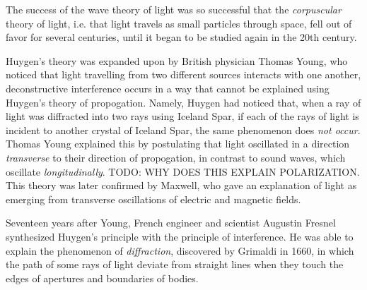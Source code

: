 The success of the wave theory of light was so successful that the \emph{corpuscular} theory of light, i.e. that light travels as small particles through space, fell out of favor for several centuries, until it began to be studied again in the 20th century.

Huygen's theory was expanded upon by British physician Thomas Young, who noticed that light travelling from two different sources interacts with one another, deconstructive interference occurs in a way that cannot be explained using Huygen's theory of propogation. Namely, Huygen had noticed that, when a ray of light was diffracted into two rays using Iceland Spar, if each of the rays of light is incident to another crystal of Iceland Spar, the same phenomenon does \emph{not occur}. Thomas Young explained this by postulating that light oscillated in a direction \emph{transverse} to their direction of propogation, in contrast to sound waves, which oscillate \emph{longitudinally}. TODO: WHY DOES THIS EXPLAIN POLARIZATION. This theory was later confirmed by Maxwell, who gave an explanation of light as emerging from transverse oscillations of electric and magnetic fields.


Seventeen years after Young, French engineer and scientist Augustin Fresnel synthesized Huygen's principle with the principle of interference. He was able to explain the phenomenon of \emph{diffraction}, discovered by Grimaldi in 1660, in which the path of some rays of light deviate from straight lines when they touch the edges of apertures and boundaries of bodies.





